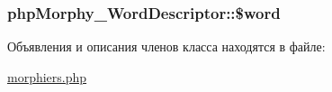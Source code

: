 \label{classphpMorphy__WordDescriptor_acba78adb26fe19aa780577b8d8a7dc19}
\hypertarget{classphpMorphy__WordDescriptor_a285cd23cacf54e108d55aa508045d066}{
\subsubsection[{\$word}]{\setlength{\rightskip}{0pt plus 5cm}phpMorphy\_\-WordDescriptor::\$word}}
\label{classphpMorphy__WordDescriptor_a285cd23cacf54e108d55aa508045d066}


Объявления и описания членов класса находятся в файле:\begin{DoxyCompactItemize}
\item 
\hyperlink{morphiers_8php}{morphiers.php}\end{DoxyCompactItemize}

